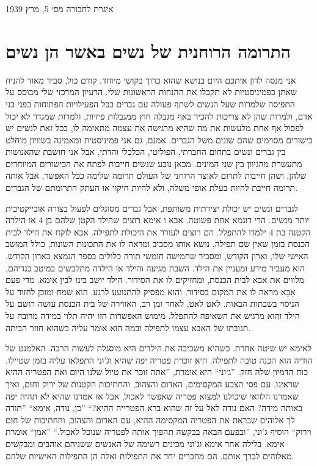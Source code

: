 \documentclass[14pt, article, extrafontsizes, twopage, a4paper]{memoir}
\newcommand{\attr}[1]{
{\raggedright\smaller#1}
}
\begin{document}
\attr{איגרת לחבורה מס׳ 5, מרץ 1939}

\chapter{התרומה הרוחנית של נשים באשר הן נשים}

אני מנסה לדון איתכם היום בנושא
שהוא כרוך בקושי מיוחד. קודם כול,
סביר מאוד להניח שאתן כפמיניסטיות לא תקבלו
את ההנחות הראשונות שלי. הרעיון המרכזי שלי מבוסס על התפיסה
שלמרות שעל הנשים לשתף פעולה עם גברים בכל
הפעילויות הפתוחות בפני בני אדם, ולמרות שהן לא צריכות
להכיר באף מגבלה חוץ ממגבלות פיזיות, ולמרות שמגדר
לא יכול לפסול אף אחת מלעשות את מה שהיא
מרגישה את עצמה מתאימה לו, בכל זאת לנשים יש כישורים מסוימים
שהם שונים משל הגברים. אמנם,
גם אני פמיניסטית ומאמינה בשוויון מוחלט בין
גברים ונשים בתחום החברתי, הפוליטי, הכלכלי והדתי,
אבל אני חושבת שהאנושות מתעשרת
מהגיוון בין שני המינים. מכאן נובע שנשים חייבות
לפתח את הכישורים המיוחדים שלהן, ושהן חייבות לתרום
לאוצר הרוחני של העולם תרומה שלימה
ככל האפשר, אבל אותה תרומה חייבת להיות בעלת אופי משלה,
ולא להיות חיקוי או העתק התרומתם
של הגברים.

לגברים ונשים יש יכולת יצירתית משותפת, אבל
גברים מסוגלים לפעול בצורה אובייקטיבית יותר מנשים. הרי
דוגמא אחת פשוטה. אבא ו אימא רוצים שהילד הקטן שלהם
בן 4 או הילדה הקטנה בת 4 ילמדו להתפלל. הם רוצים
לעורר את היכולת לתפילה. אבא לוקח את הילד
לבית הכנסת בזמן שאין שם תפילה, נושא
אותו מסביב ומראה לו את התכונות השונות, כולל המושב האישי שלו,
וארון הקודש, ומסביר שחמישה חומשי תורה
כלולים בספר הנמצא בארון הקודש.
הוא מעביר מידע ומעניין את הילד. השבת
מגיעה והילד או הילדה מתלבשים במיטב בגדיהם,
מלווים את אבא לבית הכנסת, ומחזיקים לו את הסידור.
הילד יושב בינו לבין  אימא.
מדי פעם אַבָּא מראה לו את המקום בסידור, והוא מפסיק
להתנועע לרגע. הוא שמח ומוכן לחזור
על הניסוי בשבתות הבאות. לאט לאט, לאחר
זמן רב, האווירה של בית הכנסת עושה רושם
על הילד והוא מרגיש את השאיפה להתפלל.
מימוש האפשרות הזו יהיה תלוי במידה מרובה
על תגובתו של האבא עצמו לתפילה
ובמה הוא אומר עליה כשהוא חוזר הביתה.

לאימא יש שיטה אחרת. כשהיא משכיבה את הילדים היא מוסגלת לעשות
הרבה. האלמנט של הודיה הוא
הכנה טובה לתפילה. היא זוכרת פטריה יפה
שהיא וג'וני התפלאו עליה בזמן שטיילו.
כוח הדמיון שלה חזק. ''ג׳וני`` היא
אומרת, ''אתה זוכר את טיול שלנו היום ואת הפטריה ההיא
שראינו, עם פסי הצבע המקסימים, האדום והצהוב,
והחתיכות הקטנות של ירוק וחום, ואיך שאמרנו
הלוואי שיכולנו למצוא פטריה שאפשר לאכול, אבל אז אמרנו
שהיא לא תהיה יפה באותה מידה? האם נודה לאל
על זה שהוא ברא הפטרייה ההיא?“ ''כן, נודה,  אימא`` ''תודה לך
אלוהים שבראת את הפטריה המקסימה ההיא, עם האדום והצהוב,
והחתיכות של חום וירוק``  הוסיף ג'וני, ''ובפעם
הבאה בבקשה תהפוך אותה לפטריה שנוכל לאכול.`` ''אמן``
אומרת  אימא. בלילה אחר  אימא וג'וני
מכינים רשימה של האנשים ששניהם אוהבים ומבקשים מאלוהים
לברך אותם. הם מחברים יחד את התפילות ואלה הן
התפילות האישיות שלהם.
\end{document}
